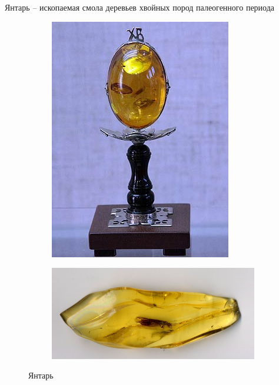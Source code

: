 \documentclass[_Banking_p3.tex]{subfiles}
\begin{document}
\begin{frame}{Янтарь }{– ископаемая смола деревьев хвойных пород палеогенного периода}
\begin{figure}	
	\centering
	\begin{subfigure}[t]{4.3cm}
		\centering
		\includegraphics[scale=0.45]{img/amber1.png}
	\caption{}\label{fig:amber1}	
	\end{subfigure}
	\quad
	\begin{subfigure}[t]{4.3cm}
		\centering
		\includegraphics[scale=0.35]{img/amber2.png}
		\caption{}\label{fig:amber2}
	\end{subfigure}
	\caption{Янтарь}\label{fig:amber}
\end{figure}
\end{frame}
\end{document}
